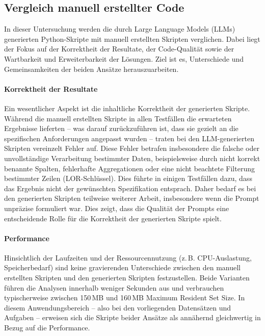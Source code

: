 \documentclass[11pt,a4paper]{article}
\begin{document}
\subsection{Vergleich manuell erstellter Code}
\label{sec:vergleich_manuell_llm}
In dieser Untersuchung werden die durch Large Language Models (LLMs) generierten Python-Skripte mit manuell erstellten Skripten verglichen. Dabei liegt der Fokus auf der Korrektheit der Resultate, der Code-Qualität sowie der Wartbarkeit und Erweiterbarkeit der Lösungen. Ziel ist es, Unterschiede und Gemeinsamkeiten der beiden Ansätze herauszuarbeiten.

\paragraph{Korrektheit der Resultate}
Ein wesentlicher Aspekt ist die inhaltliche Korrektheit der generierten Skripte. Während die manuell erstellten Skripte in allen Testfällen die erwarteten Ergebnisse lieferten – was darauf zurückzuführen ist, dass sie gezielt an die spezifischen Anforderungen angepasst wurden – traten bei den LLM-generierten Skripten vereinzelt Fehler auf. Diese Fehler betrafen insbesondere die falsche oder unvollständige Verarbeitung bestimmter Daten, beispielsweise durch nicht korrekt benannte Spalten, fehlerhafte Aggregationen oder eine nicht beachtete Filterung bestimmter Zeilen (LOR-Schlüssel). Dies führte in einigen Testfällen dazu, dass das Ergebnis nicht der gewünschten Spezifikation entsprach. Daher bedarf es bei den generierten Skripten teilweise weiterer Arbeit, insbesondere wenn die Prompt unpräzise formuliert war. Dies zeigt, dass die Qualität der Prompts eine entscheidende Rolle für die Korrektheit der generierten Skripte spielt.

\paragraph{Performance}
Hinsichtlich der Laufzeiten und der Ressourcennutzung (z.\,B. CPU-Auslastung, Speicherbedarf) sind keine gravierenden Unterschiede zwischen den manuell erstellten Skripten und den generierten Skripten festzustellen. Beide Varianten führen die Analysen innerhalb weniger Sekunden aus und verbrauchen typischerweise zwischen 150\,MB und 160\,MB Maximum Resident Set Size. In diesem Anwendungsbereich -- also bei den vorliegenden Datensätzen und Aufgaben -- erweisen sich die Skripte beider Ansätze als annähernd gleichwertig in Bezug auf die Performance.
\end{document}
